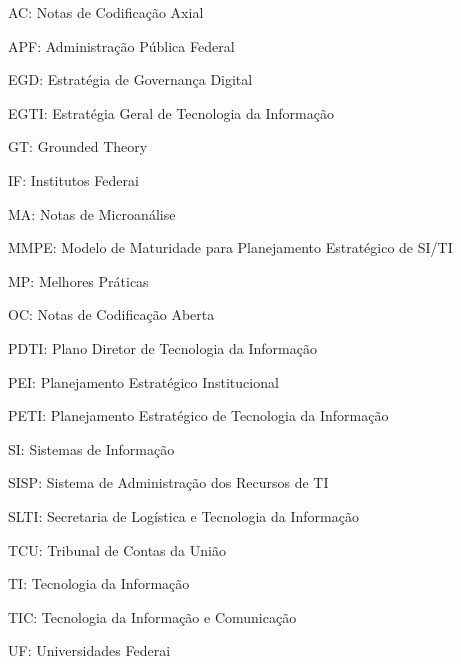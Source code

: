 \documentclass[
	12pt,				%
	openany, %
	oneside, %
	a4paper,			%
	english,			%
	french,				%
	spanish,			%
	brazil				%
	]{abntex2}
\begin{document}
\listoffigures*
\cleardoublepage

\listoftables*
\cleardoublepage

\begin{siglas}
\item AC: Notas de Codificação Axial
\item APF: Administração Pública Federal
\item EGD: Estratégia de Governança Digital
\item EGTI: Estratégia Geral de Tecnologia da Informação
\item GT: Grounded Theory
\item IF: Institutos Federai
\item MA: Notas de Microanálise
\item MMPE: Modelo de Maturidade para Planejamento Estratégico de SI/TI
\item MP: Melhores Práticas
\item OC: Notas de Codificação Aberta
\item PDTI: Plano Diretor de Tecnologia da Informação
\item PEI: Planejamento Estratégico Institucional
\item PETI: Planejamento Estratégico de Tecnologia da Informação
\item SI: Sistemas de Informação
\item SISP: Sistema de Administração dos Recursos de TI
\item SLTI: Secretaria de Logística e Tecnologia da Informação
\item TCU: Tribunal de Contas da União
\item TI: Tecnologia da Informação
\item TIC: Tecnologia da Informação e Comunicação
\item UF: Universidades Federai

\end{siglas}

\end{document}
